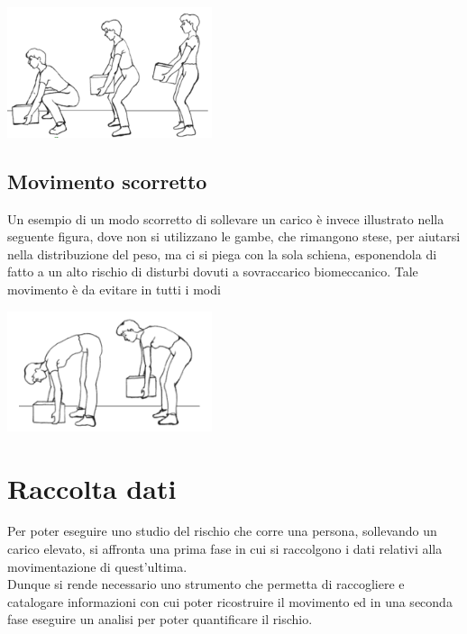 \documentclass[a4paper]{article}
\begin{document}
\begin{center}
	\makebox[\linewidth]{}
	\includegraphics[width=60mm,scale=0.7]{./images/sollevamento_corretto.png} 
	\makebox[\linewidth]{}
	\makebox[\linewidth]{}
\end{center} 

\subsection{Movimento scorretto}
Un esempio di un modo scorretto di sollevare un carico è invece illustrato nella seguente figura, dove non si utilizzano le gambe, che rimangono stese, per
aiutarsi nella distribuzione del peso, ma ci si piega con la sola schiena, esponendola di fatto a un alto rischio di disturbi dovuti a sovraccarico biomeccanico. Tale movimento è da evitare in tutti i modi

\begin{center}
	\makebox[\linewidth]{}
	\includegraphics[width=60mm,scale=0.7]{./images/sollevamento_scorretto.png} 
	\makebox[\linewidth]{}
\end{center} 




	\clearpage

	\section{Raccolta dati}
Per poter eseguire uno studio del rischio che corre una persona, sollevando un carico elevato, si affronta una prima fase in cui si raccolgono i dati relativi alla movimentazione di quest'ultima. \\
Dunque si rende necessario uno strumento che permetta di raccogliere e catalogare informazioni con cui poter ricostruire il movimento ed in una seconda fase eseguire un analisi per poter quantificare il rischio. \\
\end{document}
